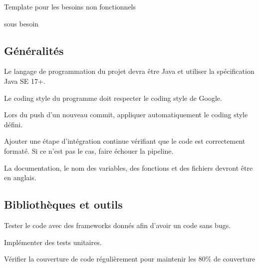 \documentclass{article}
\begin{document}
\begin{nonfunctionnalneedbox}[F?: Titre]
    Template pour les besoins non fonctionnels
    \begin{subneedbox}[F?.?: Titre]
        sous besoin
    \end{subneedbox}
\end{nonfunctionnalneedbox}

\subsection{Généralités}

\begin{nonfunctionnalneedbox}
    Le langage de programmation du projet devra être Java et utiliser la spécification Java SE 17+.
\end{nonfunctionnalneedbox}

\begin{nonfunctionnalneedbox}
    Le coding style du programme doit respecter le coding style de Google.
    \begin{subneedbox}
        Lors du push d'un nouveau commit, appliquer automatiquement le coding style défini.
    \end{subneedbox}
    \begin{subneedbox}
        Ajouter une étape d'intégration continue vérifiant que le code est correctement formaté.
        Si ce n'est pas le cas, faire échouer la pipeline.
    \end{subneedbox}
\end{nonfunctionnalneedbox}

\begin{nonfunctionnalneedbox}
    La documentation, le nom des variables, des fonctions et des fichiers devront être en anglais.
\end{nonfunctionnalneedbox}

\subsection{Bibliothèques et outils}

\begin{nonfunctionnalneedbox}
    Tester le code avec des frameworks donnés afin d'avoir un code sans bugs.
    \begin{subneedbox}
        Implémenter des tests unitaires.
    \end{subneedbox}

    \begin{subneedbox}
        Vérifier la couverture de code régulièrement pour maintenir les 80\% de couverture
    \end{subneedbox}
\end{nonfunctionnalneedbox}
\end{document}
